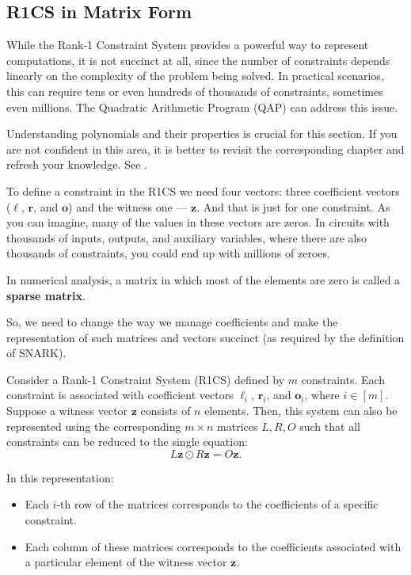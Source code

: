 \documentclass[../../book.tex]{subfiles}
\begin{document}
\subsection{R1CS in Matrix Form}

While the Rank-1 Constraint System provides a powerful way to represent computations, it is not 
succinct at all, since the number of constraints depends linearly on the complexity of the problem 
being solved. In practical scenarios, this can require tens or even hundreds of thousands of 
constraints, sometimes even millions. The Quadratic Arithmetic Program (QAP) can address this issue.

\begin{remark}
    Understanding polynomials and their properties is crucial for this section.
    If you are not confident in this area, it is better to revisit the
    corresponding chapter and refresh your knowledge. See
    .
\end{remark}

To define a constraint in the R1CS we need four vectors: three coefficient
vectors ($\boldsymbol{\ell}$, $\boldsymbol{r}$, and $\boldsymbol{o}$) and the
witness one --- $\mathbf{z}$. And that is just for one constraint. As you can
imagine, many of the values in these vectors are zeros. In circuits with
thousands of inputs, outputs, and auxiliary variables, where there are also
thousands of constraints, you could end up with millions of zeroes.

\begin{remark}
    In numerical analysis, a matrix in which most of the elements are zero is
    called a \textbf{sparse matrix}.
\end{remark}

So, we need to change the way we manage coefficients and make the
representation of such matrices and vectors succinct (as required by the
definition of SNARK).

\begin{theorem}
    Consider a Rank-1 Constraint System (R1CS) defined by $m$ constraints. Each
    constraint is associated with coefficient vectors $\boldsymbol{\ell}_i$,
    $\boldsymbol{r}_i$, and $\boldsymbol{o}_i$, where $i \in [m]$. Suppose a
    witness vector $\mathbf{z}$ consists of $n$ elements. Then, this system can
    also be represented using the corresponding $m \times n$ matrices $L,R,O$
    such that all constraints can be reduced to the single equation:
    \begin{equation*}
        L\mathbf{z} \odot R\mathbf{z} = O\mathbf{z}.
    \end{equation*}
    
    In this representation:
    \begin{itemize}
        \item Each $i$-th row of the matrices corresponds to the coefficients of a specific constraint.
        \item Each column of these matrices corresponds to the coefficients
        associated with a particular element of the witness vector $\mathbf{z}$.
    \end{itemize}
\end{theorem}
\end{document}
